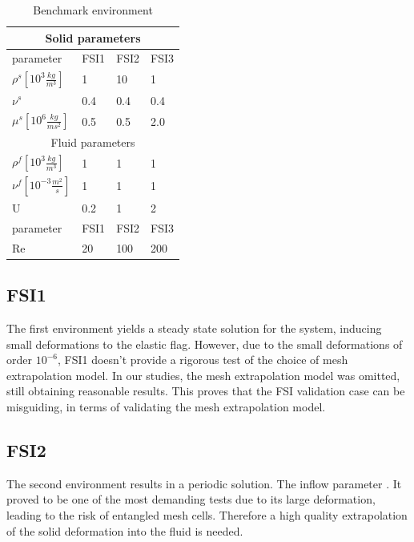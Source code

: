 \begin{table}[h]
\centering
\caption{Benchmark environment}
\label{my-label}
\begin{tabular}{ |p{3cm}||p{2cm}|p{2cm}|p{2cm}|  }
 \hline
 \multicolumn{4}{|c|}{Solid parameters} \\
 \hline
 parameter              & FSI1 & FSI2 & FSI3 \\
 \hline
 $\rho^s [10^{3} \frac{kg}{m^3}]$ & 1    & 10   & 1    \\
$\nu^s$ & 0.4  & 0.4  & 0.4  \\
$\mu^s  [10^{6}\frac{kg}{ms^2}]$  & 0.5  & 0.5  & 2.0  \\
 \hline
 \multicolumn{4}{|c|}{Fluid parameters} \\
 \hline
$\rho^f [10^{3}\frac{kg}{m^3}]$ & 1    & 1    & 1    \\
$\nu^f  [10^{-3}\frac{m^2}{s}]$  & 1    & 1    & 1    \\
U                      & 0.2  & 1    & 2    \\
parameter              & FSI1 & FSI2 & FSI3 \\
Re                     & 20   & 100  & 200 \\
\hline
\end{tabular}
\end{table}


\subsection{FSI1}
The first environment yields a steady state solution for the system, inducing small deformations to the elastic flag. However, due to the small deformations of order $10^{-6}$, FSI1 doesn't provide a rigorous test of the choice of mesh extrapolation model. In our studies, the mesh extrapolation model was omitted, still obtaining reasonable results. This proves that the FSI validation case can be misguiding, in terms of validating the mesh extrapolation model. 
 

\subsection{FSI2}
The second environment results in a periodic solution. The inflow parameter .
It proved to be one of the most demanding tests due to its large deformation, leading to the risk of entangled mesh cells. Therefore a high quality extrapolation of the solid deformation into the fluid is needed. 
\\
